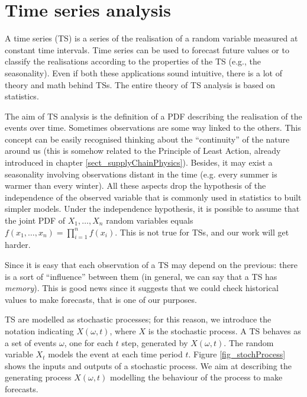 \section{Time series analysis} \label{secTimeSeries}


A time series (TS) is a series of the realisation of a random variable measured at constant time intervals. Time series can be used to forecast future values or to classify the realisations according to the properties of the TS (e.g., the seasonality). Even if both these applications sound intuitive, there is a lot of theory and math behind TSs. The entire theory of TS analysis is based on statistics.\par

The aim of TS analysis is the definition of a PDF describing the realisation of the events over time. Sometimes observations are some way linked to the others. This concept can be easily recognised thinking about the “continuity” of the nature around us (this is somehow related to the Principle of Least Action, already introduced in chapter \ref{sect_supplyChainPhysics}). Besides, it may exist a seasonality involving observations distant in the time (e.g. every summer is warmer than every winter). All these aspects drop the hypothesis of the independence of the observed variable that is commonly used in statistics to built simpler models. Under the independence hypothesis, it is possible to assume that the joint PDF of $X_1,\ldots,X_n$ random variables equals $f(x_1,\ldots,x_n)=\prod_{i=1}^{n}{f(x_i)}$. This is not true for TSs, and our work will get harder.\par

Since it is easy that each observation of a TS may depend on the previous: there is a sort of “influence” between them (in general, we can say that a TS has \textit{memory}). This is good news since it suggests that we could check historical values to make forecasts, that is one of our purposes.\par

TS are modelled as stochastic processes; for this reason, we introduce the notation indicating $X(\omega,t)$, where $X$ is the stochastic process. A TS behaves as a set of events $\omega$, one for each $t$ step, generated by $X(\omega,t)$. The random variable $X_t$ models the event at each time period $t$. Figure \ref{fig_stochProcess} shows the inputs and outputs of a stochastic process. We aim at describing the generating process $X(\omega,t)$ modelling the behaviour of the process to make forecasts.


